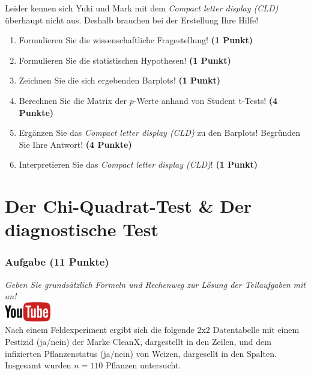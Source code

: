 \documentclass[a4paper, 9pt]{scrartcl}\usepackage[]{graphicx}\usepackage[]{xcolor}
\begin{document}
Leider kennen sich Yuki und Mark mit dem \textit{Compact letter display (CLD)} überhaupt nicht aus. Deshalb brauchen bei der Erstellung Ihre Hilfe!  

\begin{enumerate}
  \item Formulieren Sie die wissenschaftliche Fragestellung! \textbf{(1 Punkt)}
  \item Formulieren Sie die statistischen Hypothesen! \textbf{(1 Punkt)}
\item Zeichnen Sie die sich ergebenden Barplots! \textbf{(1 Punkt)}
\item Berechnen Sie die Matrix der $p$-Werte anhand von Student t-Tests! \textbf{(4 Punkte)}
\item Ergänzen Sie das \textit{Compact letter display (CLD)} zu den Barplots! Begründen Sie Ihre Antwort! \textbf{(4 Punkte)}
\item Interpretieren Sie das \textit{Compact letter display (CLD)}! \textbf{(1 Punkt)} 
\end{enumerate}

 
\clearpage
\part{Der Chi-Quadrat-Test \& Der diagnostische Test}

\section{Aufgabe \hfill (11 Punkte)}

\textit{Geben Sie grunds{\"a}tzlich Formeln und Rechenweg zur L{\"o}sung der
  Teilaufgaben mit an!} \\[1Ex]

\hfill\href{https://youtu.be/-Kva5wc5Elw}{\includegraphics[width =
  2cm]{img/youtube}}\\[1Ex]




Nach einem Feldexperiment ergibt sich die folgende 2x2 Datentabelle mit einem
Pestizid (ja/nein) der Marke CleanX, dargestellt in den Zeilen, und
dem infizierten Pflanzenstatus (ja/nein) von Weizen, dargesellt in
den Spalten. Insgesamt wurden $n = 110$ Pflanzen untersucht.
\vspace{5Ex}
\end{document}
